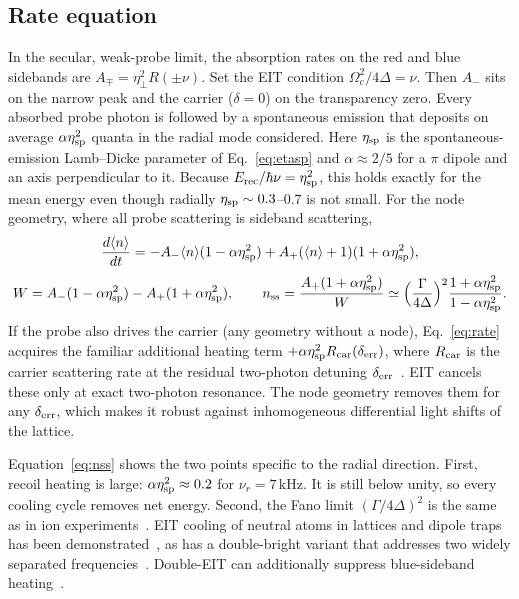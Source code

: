 \documentclass[11pt,a4paper]{article}
\newcommand{\SI}[2]{\ensuremath{#1\,\mathrm{#2}}}
\newcommand{\Om}{\Omega}
\newcommand{\etaeff}{\eta_{\perp}}
\begin{document}
\subsection{Rate equation}
In the secular, weak-probe limit, the absorption rates on the red and blue sidebands are $A_\mp=\etaeff^2R(\pm\nu)$. Set the EIT condition $\Om_c^2/4\Delta=\nu$. Then $A_-$ sits on the narrow peak and the carrier ($\delta=0$) on the transparency zero. Every absorbed probe photon is followed by a spontaneous emission that deposits on average $\alpha\eta_{\rm sp}^2$ quanta in the radial mode considered. Here $\eta_{\rm sp}$ is the spontaneous-emission Lamb--Dicke parameter of Eq.~\eqref{eq:etasp} and $\alpha\approx2/5$ for a $\pi$ dipole and an axis perpendicular to it. Because $E_{\rm rec}/\hbar\nu=\eta_{\rm sp}^2$, this holds exactly for the mean energy even though radially $\eta_{\rm sp}\sim0.3$--$0.7$ is not small. For the node geometry, where all probe scattering is sideband scattering,
\begin{equation}
  \frac{d\langle n\rangle}{dt}=-A_-\langle n\rangle(1-\alpha\eta_{\rm sp}^2)+A_+(\langle n\rangle+1)(1+\alpha\eta_{\rm sp}^2),
  \label{eq:rate}
\end{equation}
\begin{equation}
  W=A_-(1-\alpha\eta_{\rm sp}^2)-A_+(1+\alpha\eta_{\rm sp}^2),\qquad
  n_{\rm ss}=\frac{A_+(1+\alpha\eta_{\rm sp}^2)}{W}\simeq\Big(\frac{\Gamma}{4\Delta}\Big)^2\frac{1+\alpha\eta_{\rm sp}^2}{1-\alpha\eta_{\rm sp}^2}.
  \label{eq:nss}
\end{equation}
If the probe also drives the carrier (any geometry without a node), Eq.~\eqref{eq:rate} acquires the familiar additional heating term $+\alpha\eta_{\rm sp}^2R_{\rm car}(\delta_{\rm err})$, where $R_{\rm car}$ is the carrier scattering rate at the residual two-photon detuning $\delta_{\rm err}$~\cite{leibfried2003,eschner2003}. EIT cancels these only at exact two-photon resonance. The node geometry removes them for any $\delta_{\rm err}$, which makes it robust against inhomogeneous differential light shifts of the lattice.

Equation~\eqref{eq:nss} shows the two points specific to the radial direction. First, recoil heating is large: $\alpha\eta_{\rm sp}^2\approx0.2$ for $\nu_r=\SI{7}{kHz}$. It is still below unity, so every cooling cycle removes net energy. Second, the Fano limit $(\Gamma/4\Delta)^2$ is the same as in ion experiments~\cite{morigi2000,roos2000,lechner2016}. EIT cooling of neutral atoms in lattices and dipole traps has been demonstrated~\cite{haller2015,kampschulte2014}, as has a double-bright variant that addresses two widely separated frequencies~\cite{scharnhorst2018}. Double-EIT can additionally suppress blue-sideband heating~\cite{evers2004}.
\end{document}

